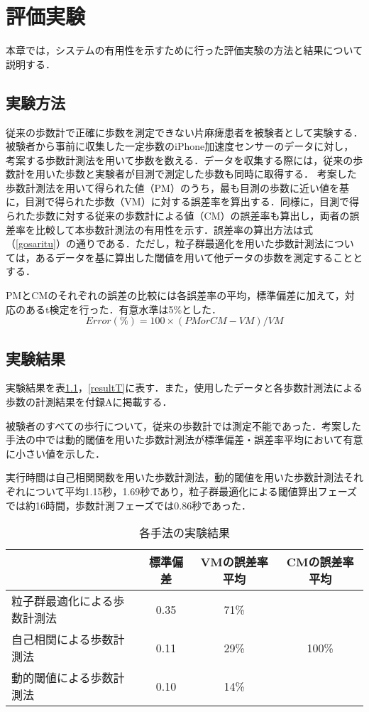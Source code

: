 \chapter{評価実験}
本章では，システムの有用性を示すために行った評価実験の方法と結果について説明する．

\section{実験方法}
従来の歩数計で正確に歩数を測定できない片麻痺患者を被験者として実験する．被験者から事前に収集した一定歩数のiPhone加速度センサーのデータに対し，考案する歩数計測法を用いて歩数を数える．データを収集する際には，従来の歩数計を用いた歩数と実験者が目測で測定した歩数も同時に取得する．
考案した歩数計測法を用いて得られた値（PM）のうち，最も目測の歩数に近い値を基に，目測で得られた歩数（VM）に対する誤差率を算出する．同様に，目測で得られた歩数に対する従来の歩数計による値（CM）の誤差率も算出し，両者の誤差率を比較して本歩数計測法の有用性を示す．誤差率の算出方法は式（\ref{gosaritu}）の通りである．ただし，粒子群最適化を用いた歩数計測法については，あるデータを基に算出した閾値を用いて他データの歩数を測定することとする．

PMとCMのそれぞれの誤差の比較には各誤差率の平均，標準偏差に加えて，対応のあるt検定を行った．有意水準は5\%とした．
\begin{equation}
  \label{gosaritu}
  Error(\%) = 100 \times (PM or CM - VM) / VM
\end{equation}

\section{実験結果}
実験結果を表\ref{result}，\ref{resultT}に表す．また，使用したデータと各歩数計測法による歩数の計測結果を付録Aに掲載する．

被験者のすべての歩行について，従来の歩数計では測定不能であった．考案した手法の中では動的閾値を用いた歩数計測法が標準偏差・誤差率平均において有意に小さい値を示した．

実行時間は自己相関関数を用いた歩数計測法，動的閾値を用いた歩数計測法それぞれについて平均1.15秒，1.69秒であり，粒子群最適化による閾値算出フェーズでは約16時間，歩数計測フェーズでは0.86秒であった．

\begin{table}[htb]
  \begin{center}
    \caption{各手法の実験結果}
    \label{result}
    \begin{tabular}{|l|c|c|c|} \hline
       & 標準偏差 & VMの誤差率平均 & CMの誤差率平均  \\ \hline \hline
      粒子群最適化による歩数計測法 & 0.35 & 71\% &  \\ \cline{1-3}
      自己相関による歩数計測法 & 0.11 & 29\% & 100\% \\ \cline{1-3}
      動的閾値による歩数計測法 & 0.10 & 14\% &  \\ \hline
    \end{tabular}
  \end{center}
\end{table}

